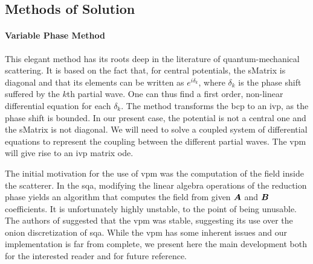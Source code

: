 \subsection{Methods of Solution}
\paragraph{Variable Phase Method}
This elegant method has its roots deep in the literature of quantum-mechanical
scattering. It is based on the fact that, for central potentials, the 
\gls{sMatrix} is diagonal and that its elements can be written as
$e^{i\delta_k}$, where $\delta_k$ is the phase shift suffered by the 
$k$th partial wave. One can thus find a first order, non-linear differential
equation \cite{CAL1967} for each $\delta_k$. The method transforms the \gls{bcp} to an \gls{ivp}, as the phase shift
is bounded. In our present case, the potential is not a central one and the
\gls{sMatrix} is not diagonal. We will need to solve a coupled system 
of differential equations to represent the coupling between the different
partial waves. The \gls{vpm} will give rise to an \gls{ivp} matrix \gls{ode}.

The initial motivation for the use of \gls{vpm} was the computation 
of the field inside the scatterer. In the \gls{sqa}, modifying 
the linear algebra operations of the reduction phase yields
an algorithm that computes the field from given $\boldsymbol{A}$ and $\boldsymbol{B}$
coefficients. It is unfortunately highly unstable, to the point 
of being unusable. The authors of \cite{FOR2012} suggested that
the \gls{vpm} was stable, suggesting its use over the onion
discretization of \gls{sqa}. While the \gls{vpm} has some inherent
issues and our implementation is far from complete, we present
here the main development both for the interested reader and for 
future reference. 

